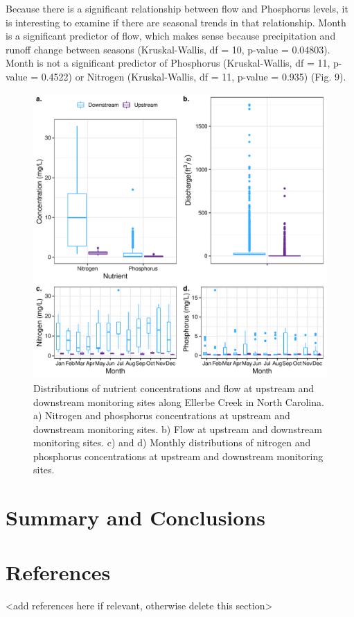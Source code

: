 \documentclass[12pt,]{article}
\begin{document}
Because there is a significant relationship between flow and Phosphorus
levels, it is interesting to examine if there are seasonal trends in
that relationship. Month is a significant predictor of flow, which makes
sense because precipitation and runoff change between seasons
(Kruskal-Wallis, df = 10, p-value = 0.04803). Month is not a significant
predictor of Phosphorus (Kruskal-Wallis, df = 11, p-value = 0.4522) or
Nitrogen (Kruskal-Wallis, df = 11, p-value = 0.935) (Fig. 9).

\begin{figure}
\centering
\includegraphics{Landman_ENV872_Project_files/figure-latex/Data Analysis Figure 9-1.pdf}
\caption{Distributions of nutrient concentrations and flow at upstream
and downstream monitoring sites along Ellerbe Creek in North Carolina.
a) Nitrogen and phosphorus concentrations at upstream and downstream
monitoring sites. b) Flow at upstream and downstream monitoring sites.
c) and d) Monthly distributions of nitrogen and phosphorus
concentrations at upstream and downstream monitoring sites.}
\end{figure}

\newpage

\hypertarget{summary-and-conclusions}{%
\section{Summary and Conclusions}\label{summary-and-conclusions}}

\newpage

\hypertarget{references}{%
\section{References}\label{references}}

\textless{}add references here if relevant, otherwise delete this
section\textgreater{}
\end{document}
